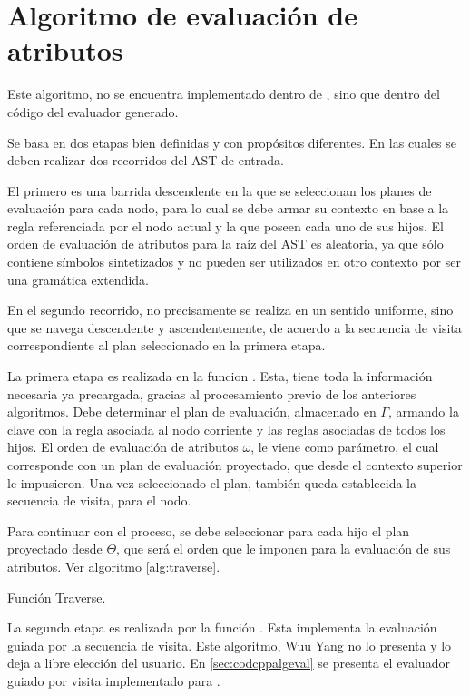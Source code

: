 \section{Algoritmo de evaluación de atributos}
\label{sec:algevalattr}

Este algoritmo, no se encuentra implementado dentro de \maggen, sino que dentro del código del evaluador generado.

Se basa en dos etapas bien definidas y con propósitos diferentes. En las cuales se deben realizar dos recorridos del AST de entrada.

El primero es una barrida descendente en la que se seleccionan los planes de evaluación para cada nodo, para lo cual se debe armar su contexto en base a la regla referenciada por el nodo actual y la que poseen cada uno de sus hijos. El orden de evaluación de atributos para la raíz del AST es aleatoria, ya que sólo contiene símbolos sintetizados y no pueden ser utilizados en otro contexto por ser una gramática extendida.

En el segundo recorrido, no precisamente se realiza en un sentido uniforme, sino que se navega descendente y ascendentemente, de acuerdo a la secuencia de visita correspondiente al plan seleccionado en la primera etapa. 

La primera etapa es realizada en la funcion . Esta, tiene toda la información necesaria ya precargada, gracias al procesamiento previo de los anteriores algoritmos. Debe determinar el plan de evaluación, almacenado en $\Gamma$, armando la clave con la regla asociada al nodo corriente y las reglas asociadas de todos los hijos. El orden de evaluación de atributos $\omega$, le viene como parámetro, el cual corresponde con un plan de evaluación proyectado, que desde el contexto superior le impusieron. Una vez seleccionado el plan, también queda establecida la secuencia de visita, para el nodo.

Para continuar con el proceso, se debe seleccionar para cada hijo el plan proyectado desde $\Theta$, que será el orden que le imponen para la evaluación de sus atributos. Ver algoritmo \ref{alg:traverse}.

\begin{algorithm}[!ht]

\vspace{-0.5cm}
\caption{\label{alg:traverse}Función Traverse.}
\end{algorithm}

La segunda etapa es realizada por la función . Esta implementa la evaluación guiada por la secuencia de visita. Este algoritmo, Wuu Yang no lo presenta y lo deja a libre elección del usuario. En \ref{sec:codcppalgeval} se presenta el evaluador guiado por visita implementado para \maggen. 

